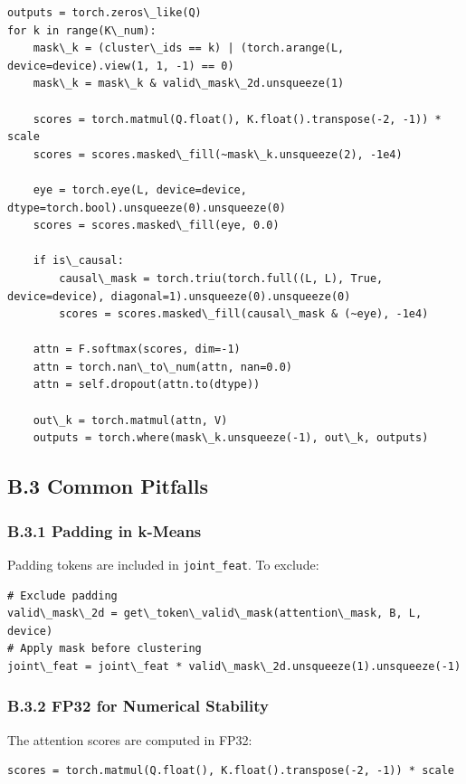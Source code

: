 \begin{lstlisting}
outputs = torch.zeros\_like(Q)
for k in range(K\_num):
    mask\_k = (cluster\_ids == k) | (torch.arange(L, device=device).view(1, 1, -1) == 0)
    mask\_k = mask\_k & valid\_mask\_2d.unsqueeze(1)

    scores = torch.matmul(Q.float(), K.float().transpose(-2, -1)) * scale
    scores = scores.masked\_fill(~mask\_k.unsqueeze(2), -1e4)

    eye = torch.eye(L, device=device, dtype=torch.bool).unsqueeze(0).unsqueeze(0)
    scores = scores.masked\_fill(eye, 0.0)

    if is\_causal:
        causal\_mask = torch.triu(torch.full((L, L), True, device=device), diagonal=1).unsqueeze(0).unsqueeze(0)
        scores = scores.masked\_fill(causal\_mask & (~eye), -1e4)

    attn = F.softmax(scores, dim=-1)
    attn = torch.nan\_to\_num(attn, nan=0.0)
    attn = self.dropout(attn.to(dtype))

    out\_k = torch.matmul(attn, V)
    outputs = torch.where(mask\_k.unsqueeze(-1), out\_k, outputs)
\end{lstlisting}

\subsection{B.3 Common Pitfalls}

\subsubsection{B.3.1 Padding in k-Means}

Padding tokens are included in \texttt{joint\_feat}. To exclude:

\begin{lstlisting}
# Exclude padding
valid\_mask\_2d = get\_token\_valid\_mask(attention\_mask, B, L, device)
# Apply mask before clustering
joint\_feat = joint\_feat * valid\_mask\_2d.unsqueeze(1).unsqueeze(-1)
\end{lstlisting}

\subsubsection{B.3.2 FP32 for Numerical Stability}

The attention scores are computed in FP32:

\begin{lstlisting}
scores = torch.matmul(Q.float(), K.float().transpose(-2, -1)) * scale
\end{lstlisting}


